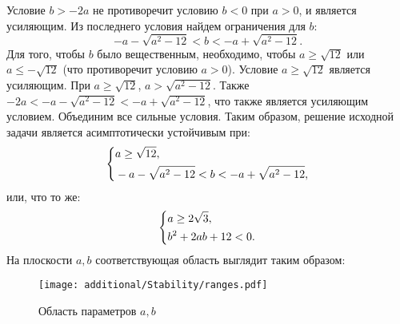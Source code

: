 		Условие $b > -2a$ не противоречит условию $b < 0$ при $a > 0$, и является усиляющим. Из последнего условия найдем ограничения для $b$:
		\[ -a - \sqrt{a^2 - 12} < b < -a + \sqrt{a^2 - 12}. \]
		Для того, чтобы $b$ было вещественным, необходимо, чтобы $a \ge \sqrt{12}$ или $a \le -\sqrt{12}$ (что противоречит условию $a > 0$). Условие $a \ge \sqrt{12}$ является усиляющим. При $a \ge \sqrt{12}$, $a > \sqrt{a^2 - 12}$. Также $-2a < -a - \sqrt{a^2 - 12} < -a + \sqrt{a^2 - 12}$, что также является усиляющим условием. Объединим все сильные условия. Таким образом, решение исходной задачи является асимптотически устойчивым при:
		\[ \left\lbrace \begin{aligned} &a \ge \sqrt{12}, \\ &-a - \sqrt{a^2 - 12} < b < -a + \sqrt{a^2 - 12}, \end{aligned} \right. \]
		или, что то же:
		\[ \left\lbrace \begin{aligned} &a \ge 2\sqrt{3}, \\ &b^2 + 2ab + 12 < 0. \end{aligned} \right. \]
		На плоскости $a, b$ соответствующая область выглядит таким образом:
		\begin{figure}[H]
			\centering
			\texttt{[image: additional/Stability/ranges.pdf]}
			\caption{Область параметров $a, b$}
		\end{figure}
